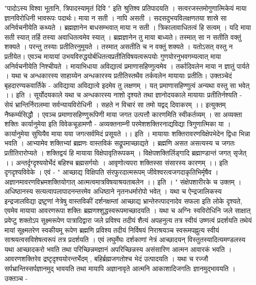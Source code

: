 "पादोऽस्य विश्वा भूतानि, त्रिपादस्यामृतं दिवि " इति श्रुतिश्व प्रतिपादयति । 
सत्वरजस्तमोगुणात्मिकेयं माया ज्ञानविरोधिनी भावरूपः पदार्थः। माया न सती । नापि असती । सदसदुभयविलक्षणतया शास्रे सा अनिर्वचनीयेति कथ्यते । ब्रह्मज्ञानेन बाधसम्भवात् माया न सती । त्रिकालावाधितत्वं हि सत्वम् । यदि माया सती स्यात् तर्हि तस्या अवाधितत्वमेव स्यात् । ब्रह्मज्ञानेन तु  माया बाध्यते। तस्मात् सा न सतीति वक्तुं शक्यते । परन्तु तस्याः प्रतीतिरनुमूयते । तस्मात् असतीति च न वक्तुं शक्यते । यतोऽसत् वस्तु न प्रतीयेत। एवञ्च मायायां उभयविरुद्धयोर्बधितत्वप्रतीतिविषयत्वरूपयोः गुणयोरनुभवगम्यत्वात् माया अनिर्वचनीयेति निश्चीयते । मायाभिधाया अविद्यात्वं प्रमाणासहिप्णुत्वमेव । तर्कादिवलेन माया न ज्ञातुं पार्यते । यथा च अन्धकारस्य साहाय्येन अन्धकारस्य प्रतीतिस्तथैव तर्कवलेन मायायाः प्रतीतिः। उक्तञ्चेदं बृहदारण्यकवार्तिके -
अविद्याया अविद्यात्वे इदमेव तु लक्षणम् ।
यत् प्रमाणासहिण्णुत्वं अन्यथा वस्तु सा भवेत् ।। इति । 
सूर्योदयकाले यथा च अन्धकारस्य नाशो दृश्यते तथा ज्ञानोदयकाले मायायाः प्रतीतिर्नश्यति - 
सेयं भ्रान्तिर्निरालम्वा सर्वन्यायविरोधिनी ।
सहते न विचारं सा तमो यद्वद् दिवाकरम् ।। 
इत्युक्तम्  नैष्कर्म्यसिद्धौ । एवञ्च प्रमाणासहिण्णुरूपिणी माया जगत उत्पत्तौ कारणमिति स्वीकर्तव्यम् । सा अव्यक्ता शक्तिः कार्यानुमेया इति विवेकचूडामणौ - 
अव्यक्तनाम्नी परमेशशक्तिरनाद्यविद्या त्रिगुणात्मिका या ।
कार्यानुमेया सुघियैव माया यया जगत्सर्वमिदं प्रसूयते ।। इति । 
मायायाः शक्तिरावरणविक्षेपभेदेन द्विधा भिन्ना भवति । आभ्यामेव शक्तिभ्यां ब्रह्मणः वास्तविकं सद्रूपमाच्छाद्यते । ब्रह्मणि असत असत्यस्य च जगतः प्रतीतिरारोप्यते ।
शक्तिद्वयं हि मायाया विक्षेपावृतिरूपकम् ।
विक्षेपशक्तिर्लिड्गादि ब्रह्माण्डान्तं जगत् सृजेत् ।। 
अन्तर्दृग्दृश्ययोर्भेदं बहिश्च ब्रह्मसर्गयोः ।
आवृणोत्यपरा शक्तिस्सा संसारस्य कारणम् ।। इति दृगदृश्यविवेके । 
एवं -
" आच्छाद्य विक्षिपति संरफुरदात्मरूपम् 
जीवेश्वरत्वजगदाकृतिभिर्मृषैव ।
अज्ञानमावरणविभ्रमशक्तियोगात् 
आत्मत्वमात्रविषयाश्रयताबलेन ।। इति । "
संक्षेपशारीरके च उक्तम् । अधिष्ठानस्य सत्यत्वापलापादनन्तरमेव अधिष्ठाने नृतनधर्मारोपो भवेत् । यथा च ऐन्द्रजालिकस्य इन्द्रजालविद्या द्रष्ट़़ृणां नेत्रेषु वास्तविकीं दर्शनक्षम्तां आच्छाद्य भ्रान्तेरुत्पादनादेव सफला इति लोके दृश्यते, एवमेव मायाया आवरणरूपा शक्तिः ब्रह्मणश्शुद्धस्वरूपमाच्छादयति । यथा च अग्निः स्वविरोधिनि जले साक्षात् प्रवेप्टु शक्तोऽप सूक्ष्मरूपेण पात्रादिद्वारा जले प्रविश्य तदीयं शैत्यं अपहनुत्य तत्र स्वीयं उष्णत्वं प्रदर्शयति तथेयं मायां सूक्ष्मतरेण स्वकीयमू रूपेण ब्रह्मणि प्रविश्य तदीयं निर्विषयं निराश्रयञ्च स्वरूमपह्नुत्य स्वीयं साश्रयत्वसविशेषत्वरूपं तत्र प्रदर्शयति । एवं लघुर्मेघः दर्शकाणां नेत्रं आच्छादयन् विस्तुतस्यादित्यमण्डलस्य यथा आच्छादकरो भवति तथा परिच्छिन्नमज्ञानं अपरिच्छिन्नस्य असंसारिण आत्मन आवारकं भवति । आवरणशक्तिरेव द्रष्टृदृश्ययोरन्तर्भेदम् , बहिर्ब्रह्मजगतोश्च भेदं उत्पादयति । यथा च रज्जौ सर्पभ्रान्तिस्सर्पज्ञानमुद् भावयति तथा मायापि अज्ञानावृते आत्मनि आकाशादिजगतिः ज्ञानमुद्भावयति । उक्तञ्च - 
